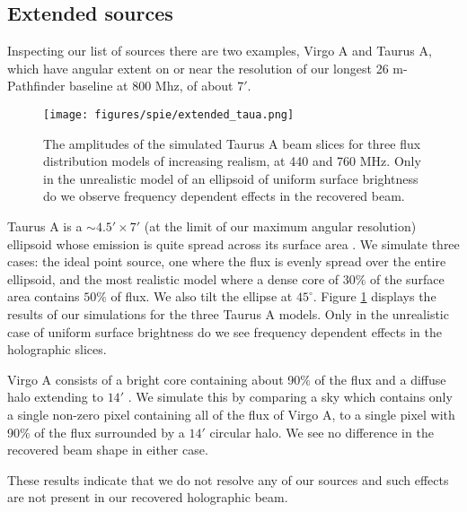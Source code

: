 \subsection{Extended sources}

Inspecting our list of sources there are two examples, Virgo A and Taurus A, which have angular extent on or near the resolution of our longest 26 m-Pathfinder baseline at 800 Mhz, of about $7'$. 
\begin{figure}[h] %
	\centering	
	\texttt{[image: figures/spie/extended\_taua.png]}%
	\caption{The amplitudes of the simulated Taurus A beam slices for three flux distribution models of increasing realism, at 440 and 760 MHz. Only in the unrealistic model of an ellipsoid of uniform surface brightness do we observe frequency dependent effects in the recovered beam.}
	\label{crabsim}
\end{figure}

Taurus A is a $\sim 4.5'\times 7'$ (at the limit of our maximum angular resolution) ellipsoid whose emission is quite spread across its surface area \citep{crab}. We simulate three cases: the ideal point source, one where the flux is evenly spread over the entire ellipsoid, and the most realistic model where a dense core of $30\%$ of the surface area contains $50\%$ of flux. We also tilt the ellipse at $45^{\circ}$. Figure \ref{crabsim} displays the results of our simulations for the three Taurus A models. Only in the unrealistic case of uniform surface brightness do we see frequency dependent effects in the holographic slices.

Virgo A consists of a bright core containing about 90$\%$ of the flux and a diffuse halo extending to $14'$ \citep{baars, m87lofar}. We simulate this by comparing a sky which contains only a single non-zero pixel containing all of the flux of Virgo A, to a single pixel with 90$\%$ of the flux surrounded by a $14'$ circular halo. We see no difference in the recovered beam shape in either case.

These results indicate that we do not resolve any of our sources and such effects are not present in our recovered holographic beam.

